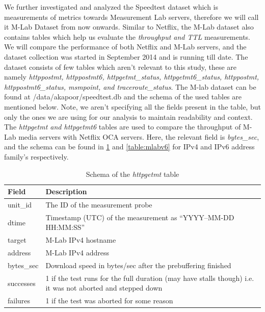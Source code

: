 We further investigated and analyzed the Speedtest dataset which is measurements of metrics towards Measurement Lab servers, therefore we will call it M-Lab Dataset from now onwards. Similar to Netflix, the M-Lab dataset also contains tables which help us evaluate the \textit{throughput and TTL} measurements. We will compare the performance of both Netflix and M-Lab servers, and the dataset collection was started in September 2014 and is running till date. 
The dataset consists of few tables which aren't relevant to this study, these are namely \textit{httppostmt, httppostmt6, httpgetmt\_status, httpgetmt6\_status, httppostmt, httppostmt6\_status, msmpoint, and traceroute\_status}. The M-lab dataset can be found at /data/akapoor/speedtest.db and the schema of the used tables are mentioned below. Note, we aren't specifying all the fields present in the table, but only the ones we are using for our analysis to maintain readability and context. The \textit{httpgetmt and httpgetmt6} tables are used to compare the throughput of M-Lab media servers with Netflix OCA servers. Here, the relevant field is \textit{bytes\_sec}, and the schema can be found in \cref{table:mlabv4} and \cref{table:mlabv6} for IPv4 and IPv6 address family's respectively.

\begin{table}[!h]
	\centering
	\caption{Schema of the \textit{httpgetmt} table}
	\label{table:mlabv4}
	\begin{tabular}{lp{10cm}}
  		\toprule
  		\textbf{Field} & \textbf{Description} \\ 
  		\midrule
  		unit\_id & The ID of the measurement probe \\ 
  		dtime & Timestamp (UTC) of the measurement as “YYYY–MM-DD HH:MM:SS” \\ 
		target & M-Lab IPv4 hostname \\ 
		address &  M-Lab IPv4 address \\ 
		bytes\_sec  & Download speed in bytes/sec after the prebuffering finished \\  
		successes  & 1 if the test runs for the full duration (may have stalls though) i.e. it was not aborted and stepped down \\ 
		failures  & 1 if the test was aborted for some reason \\
  		\bottomrule
\end{tabular}
\end{table}

